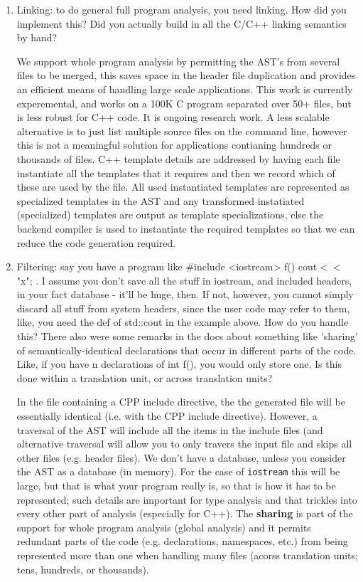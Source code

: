 \begin{enumerate}
\item Linking: to do general full program analysis, you need linking. How did you
    implement this? Did you actually build in all the C/C++ linking semantics by hand?

   We support whole program analysis by permitting the AST's from several files to be
   merged, this saves space in the header file duplication and provides an efficient means
   of handling large scale applications.  This work is currently experemental, and works
   on a 100K C program separated over 50+ files, but is less robust for C++ code.  It is 
   ongoing research work.  A less scalable alternative is to just list multiple source
   files on the command line, however this is not a meaningful solution for applications
   contianing hundreds or thousands of files.  C++ template details are addressed by
   having each file instantiate all the templates that it requires and then we record
   which of these are used by the file.  All used instantiated templates are represented
   as specialized templates in the AST and any transformed instatiated (specialized)
   templates are output as template specializations, else the backend compiler is used to
   instantiate the required templates so that we can reduce the code generation required.


\item Filtering: say you have a program like \#include <iostream> f() { cout$<<$"x"; }. I
    assume you don't save all the stuff in iostream, and included headers, in your fact
    database - it'll be huge, then. If not, however, you cannot simply discard all stuff
    from system headers, since the user code may refer to them, like, you need the def of
    std::cout in the example above. How do you handle this?
    There also were some remarks in the docs about something like 'sharing' of
    semantically-identical declarations that occur in different parts of the code. Like,
    if you have n declarations of int f(), you would only store one. Is this done within a
    translation unit, or across translation units?

    In the file containing a CPP include directive, the the generated file will be
    essentially identical (i.e. with the CPP include directive).  However, a traversal of the AST
    will include all the items in the include files (and alternative traversal will allow
    you to only travers the input file and skips all other files (e.g. header files).  
    We don't have a database, unless you
    consider the AST as a database (in memory). For the case of {\tt iostream} this will
    be large, but that is what your program really is, so that is how it has to be
    represented; such details are important for type analysis and that trickles into
    every other part of analysis (especially for C++).  The {\bf sharing} is part of
    the support for whole program analysis (global analysis) and it permits redundant 
    parts of the code (e.g. declarations, namespaces, etc.) from being represented
    more than one when handling many files (acorss translation units; tens, hundreds, 
    or thousands).



\end{enumerate}
